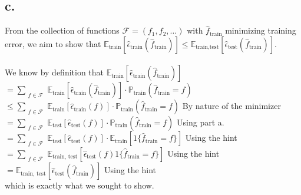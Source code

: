 \documentclass{article}
\newcommand{\1}{\mathbf{1}}
\newcommand{\E}{\mathbb{E}}
\renewcommand{\P}{\mathbb{P}}
\begin{document}
{\subsection*{c.}
From the collection of functions $\mathcal{F} = (f_1, f_2, \dots)$ with $\widehat{f}_{\text{train}}$ minimizing training error, we aim to show that $\E_{\text{train}}[\widehat{\epsilon}_{\text{train}}(\widehat{f}_{\text{train}})] \leq \E_{\text{train,test}}[\widehat{\epsilon}_{\text{test}}(\widehat{f}_{\text{train}})]$. \\ \\
We know by definition that $\E_{\text{train}}[\widehat{\epsilon}_{\text{train}}(\widehat{f}_{\text{train}})] $ \\ 
$= \sum\limits_{\substack{f \in \mathcal{F}}} \E_{\text{train}}[\widehat{\epsilon}_{\text{train}}(\widehat{f}_{\text{train}})] \cdot \P_{\text{train}}(\widehat{f}_{\text{train}} = f)$ \\
$\leq \sum\limits_{\substack{f \in \mathcal{F}}} \E_{\text{train}}[\widehat{\epsilon}_{\text{train}}(f)] \cdot \P_{\text{train}}(\widehat{f}_{\text{train}} = f)$ \hfill By nature of the minimizer \\
$= \sum\limits_{\substack{f \in \mathcal{F}}} \E_{\text{test}}[\widehat{\epsilon}_{\text{test}}(f)] \cdot \P_{\text{train}}(\widehat{f}_{\text{train}} = f)$ \hfill Using part a. \\
$= \sum\limits_{\substack{f \in \mathcal{F}}} \E_{\text{test}}[\widehat{\epsilon}_{\text{test}}(f)] \cdot \E_{\text{train}}[1\{\widehat{f}_{\text{train}} = f\}]$ \hfill Using the hint \\
$= \sum\limits_{\substack{f \in \mathcal{F}}} \E_{\text{train, test}}[\widehat{\epsilon}_{\text{test}}(f)1\{\widehat{f}_{\text{train}} = f\}]$ \hfill Using the hint \\
$= \E_{\text{train, test}}[\widehat{\epsilon}_{\text{test}}(\widehat{f}_{\text{train}})]$ \hfill Using the hint \\ 
which is exactly what we sought to show.

}
\end{document}
